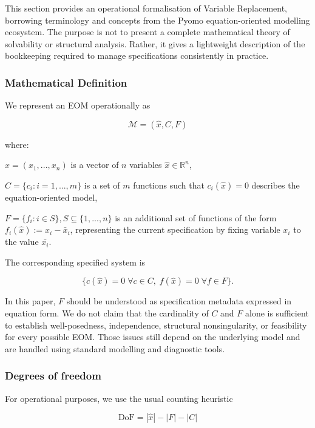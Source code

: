 This section provides an operational formalisation of Variable
Replacement, borrowing terminology and concepts from the Pyomo
equation-oriented modelling ecosystem. The purpose is not to present a
complete mathematical theory of solvability or structural analysis.
Rather, it gives a lightweight description of the bookkeeping required
to manage specifications consistently in practice.

\hypertarget{mathematical-definition}{%
\subsubsection{Mathematical Definition}\label{mathematical-definition}}

We represent an EOM operationally as

\[
\mathcal{M} = (\hat{x}, C, F)
\]

where:

\(\hat{x} = (x_1,...,x_n )\) is a vector of \(n\) variables
\(\hat{x} \in \mathbb{R}^n\),

\(C = \{c_i: i = 1,...,m\}\) is a set of \(m\) functions such that
\(c_i(\hat{x}) = 0\) describes the equation-oriented model,

\(F = \{f_i: i \in S \}, S \subseteq \{1,...,n\}\) is an additional set of
functions of the form \(f_i(\hat{x}):= x_i - \bar{x}_i\), representing
the current specification by fixing variable \(x_i\) to the value
\(\bar{x_i}\).

The corresponding specified system is

\[
\{c(\hat{x}) = 0 \; \forall c \in C,\; f(\hat{x}) = 0 \; \forall f \in F\}.
\]

In this paper, \(F\) should be understood as specification metadata
expressed in equation form. We do not claim that the cardinality of
\(C\) and \(F\) alone is sufficient to establish well-posedness,
independence, structural nonsingularity, or feasibility for every
possible EOM. Those issues still depend on the underlying model and are
handled using standard modelling and diagnostic tools.

\hypertarget{degrees-of-freedom}{%
\subsubsection{Degrees of freedom}\label{degrees-of-freedom}}

For operational purposes, we use the usual counting heuristic

\[
\text{DoF} = |\hat{x}| - |F| - |C| 
\]

